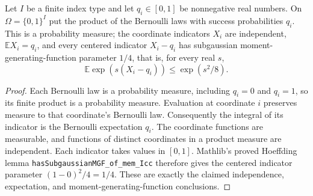 \begin{lemma}
Let $I$ be a finite index type and let $q_i\in[0,1]$ be nonnegative real
numbers. On $\Omega=\{0,1\}^I$ put the product of the Bernoulli laws with
success probabilities $q_i$. This is a probability measure; the coordinate
indicators $X_i$ are independent, $\mathbb E X_i=q_i$, and every centered
indicator $X_i-q_i$ has subgaussian moment-generating-function parameter
$1/4$, that is, for every real $s$,
\[
 \mathbb E\exp(s(X_i-q_i))\leq\exp(s^2/8).
\]
\end{lemma}
\begin{proof}
Each Bernoulli law is a probability measure, including $q_i=0$ and $q_i=1$,
so its finite product is a probability measure. Evaluation at coordinate
$i$ preserves measure to that coordinate's Bernoulli law. Consequently
the integral of its indicator is the Bernoulli expectation $q_i$.
The coordinate functions are measurable, and functions of distinct
coordinates in a product measure are independent. Each indicator takes
values in $[0,1]$. Mathlib's proved Hoeffding lemma
\texttt{hasSubgaussianMGF\_of\_mem\_Icc} therefore gives the centered
indicator parameter $(1-0)^2/4=1/4$. These are exactly the claimed
independence, expectation, and moment-generating-function conclusions.
\end{proof}
